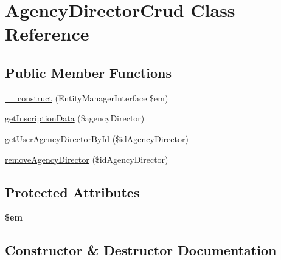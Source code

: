 \hypertarget{class_app_1_1_d_a_l_1_1_agency_director_crud}{}\section{Agency\+Director\+Crud Class Reference}
\label{class_app_1_1_d_a_l_1_1_agency_director_crud}
\subsection*{Public Member Functions}
\begin{DoxyCompactItemize}
\item 
\mbox{\hyperlink{class_app_1_1_d_a_l_1_1_agency_director_crud_a25f4258aeb5ce2a61a2504cb7c058485}{\+\_\+\+\_\+construct}} (Entity\+Manager\+Interface \$em)
\item 
\mbox{\hyperlink{class_app_1_1_d_a_l_1_1_agency_director_crud_a2f9f5d8efbb2c982b25b0c6be48a9c83}{get\+Inscription\+Data}} (\$agency\+Director)
\item 
\mbox{\hyperlink{class_app_1_1_d_a_l_1_1_agency_director_crud_ae27eb391f20086756b695081f4e80fb4}{get\+User\+Agency\+Director\+By\+Id}} (\$id\+Agency\+Director)
\item 
\mbox{\hyperlink{class_app_1_1_d_a_l_1_1_agency_director_crud_aab3676ef04d81d0f17434f67e61ece2f}{remove\+Agency\+Director}} (\$id\+Agency\+Director)
\end{DoxyCompactItemize}
\subsection*{Protected Attributes}
\begin{DoxyCompactItemize}
\item 
\mbox{\label{class_app_1_1_d_a_l_1_1_agency_director_crud_a0f2991d5fed029ef50ef619f1a532d06}} 
{\bfseries \$em}
\end{DoxyCompactItemize}


\subsection{Constructor \& Destructor Documentation}
\mbox{\label{class_app_1_1_d_a_l_1_1_agency_director_crud_a25f4258aeb5ce2a61a2504cb7c058485}} 
